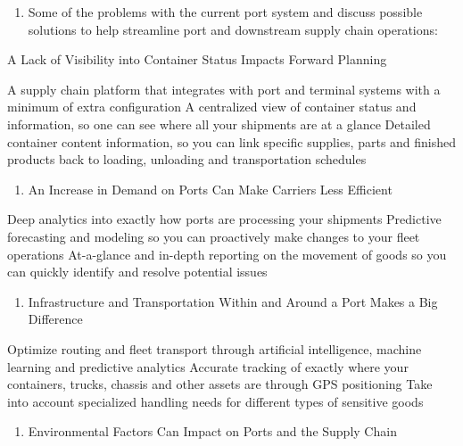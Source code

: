 \documentclass[
]{book}
\providecommand{\tightlist}{%
  \setlength{\itemsep}{0pt}\setlength{\parskip}{0pt}}
\begin{document}
\begin{enumerate}
\def\labelenumi{\arabic{enumi}.}
\setcounter{enumi}{2}
\tightlist
\item
  Some of the problems with the current port system and discuss possible solutions to help streamline port and downstream supply chain operations:
\end{enumerate}

A Lack of Visibility into Container Status Impacts Forward Planning

A supply chain platform that integrates with port and terminal systems with a minimum of extra configuration
A centralized view of container status and information, so one can see where all your shipments are at a glance
Detailed container content information, so you can link specific supplies, parts and finished products back to loading, unloading and transportation schedules

\begin{enumerate}
\def\labelenumi{\arabic{enumi}.}
\setcounter{enumi}{3}
\tightlist
\item
  An Increase in Demand on Ports Can Make Carriers Less Efficient
\end{enumerate}

Deep analytics into exactly how ports are processing your shipments
Predictive forecasting and modeling so you can proactively make changes to your fleet operations
At-a-glance and in-depth reporting on the movement of goods so you can quickly identify and resolve potential issues

\begin{enumerate}
\def\labelenumi{\arabic{enumi}.}
\setcounter{enumi}{4}
\tightlist
\item
  Infrastructure and Transportation Within and Around a Port Makes a Big Difference
\end{enumerate}

Optimize routing and fleet transport through artificial intelligence, machine learning and predictive analytics
Accurate tracking of exactly where your containers, trucks, chassis and other assets are through GPS positioning
Take into account specialized handling needs for different types of sensitive goods

\begin{enumerate}
\def\labelenumi{\arabic{enumi}.}
\setcounter{enumi}{5}
\tightlist
\item
  Environmental Factors Can Impact on Ports and the Supply Chain
\end{enumerate}
\end{document}
